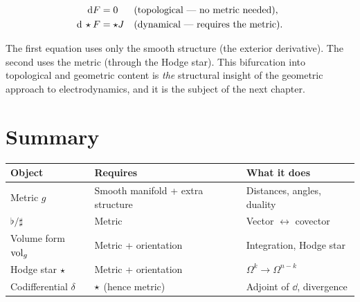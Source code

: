 \begin{align}
\mathrm{d} F &= 0 & &\text{(topological --- no metric needed)}, \\
\mathrm{d}\,\star F &= \star J & &\text{(dynamical --- requires the metric)}.
\end{align}

The first equation uses only the smooth structure (the exterior derivative). The second uses the metric (through the Hodge star). This bifurcation into topological and geometric content is \emph{the} structural insight of the geometric approach to electrodynamics, and it is the subject of the next chapter.

\section{Summary}

\begin{table}[h]
\centering
\renewcommand{\arraystretch}{1.4}
\begin{tabular}{lll}
\toprule
\textbf{Object} & \textbf{Requires} & \textbf{What it does} \\
\midrule
Metric $g$ & Smooth manifold + extra structure & Distances, angles, duality \\
$\flat / \sharp$ & Metric & Vector $\leftrightarrow$ covector \\
Volume form $\operatorname{vol}_g$ & Metric + orientation & Integration, Hodge star \\
Hodge star $\star$ & Metric + orientation & $\Omega^k \to \Omega^{n-k}$ \\
Codifferential $\delta$ & $\star$ (hence metric) & Adjoint of $\dd$, divergence \\
\bottomrule
\end{tabular}
\end{table}
